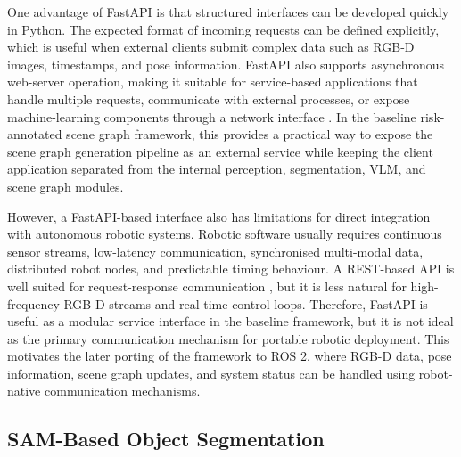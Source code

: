 One advantage of FastAPI is that structured interfaces can be developed quickly in Python. The expected format of incoming requests can be defined explicitly, which is useful when external clients submit complex data such as RGB-D images, timestamps, and pose information. FastAPI also supports asynchronous web-server operation, making it suitable for service-based applications that handle multiple requests, communicate with external processes, or expose machine-learning components through a network interface \cite{fastapi_docs}. In the baseline risk-annotated scene graph framework, this provides a practical way to expose the scene graph generation pipeline as an external service while keeping the client application separated from the internal perception, segmentation, VLM, and scene graph modules.

However, a FastAPI-based interface also has limitations for direct integration with autonomous robotic systems. Robotic software usually requires continuous sensor streams, low-latency communication, synchronised multi-modal data, distributed robot nodes, and predictable timing behaviour. A REST-based API is well suited for request-response communication \cite{fastapi_docs}, but it is less natural for high-frequency RGB-D streams and real-time control loops. Therefore, FastAPI is useful as a modular service interface in the baseline framework, but it is not ideal as the primary communication mechanism for portable robotic deployment. This motivates the later porting of the framework to ROS 2, where RGB-D data, pose information, scene graph updates, and system status can be handled using robot-native communication mechanisms.


\subsection{SAM-Based Object Segmentation}

